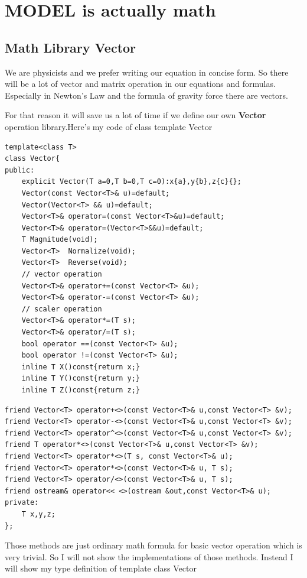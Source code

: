\documentclass[12pt]{article}
\begin{document}
\section{MODEL is actually math}
\subsection{Math Library Vector}
We are physicists and we prefer writing our equation in concise form.
So there will be a lot of vector and matrix operation in our equations and formulas.
Especially in Newton's Law and the formula of gravity force there are vectors.

For that reason it will save us a lot of time if we define our own \textbf{Vector} operation
library\cite{mathlibrary}.Here's my code of class template Vector
\begin{lstlisting}[caption=Vector Library I]
template<class T>
class Vector{
public:
    explicit Vector(T a=0,T b=0,T c=0):x{a},y{b},z{c}{};
    Vector(const Vector<T>& u)=default;
    Vector(Vector<T> && u)=default;
    Vector<T>& operator=(const Vector<T>&u)=default;
    Vector<T>& operator=(Vector<T>&&u)=default;
    T Magnitude(void);
    Vector<T>  Normalize(void);
    Vector<T>  Reverse(void);
    // vector operation
    Vector<T>& operator+=(const Vector<T> &u);
    Vector<T>& operator-=(const Vector<T> &u);
    // scaler operation
    Vector<T>& operator*=(T s);	
    Vector<T>& operator/=(T s);	
    bool operator ==(const Vector<T> &u);
    bool operator !=(const Vector<T> &u);
    inline T X()const{return x;}
    inline T Y()const{return y;}
    inline T Z()const{return z;}
\end{lstlisting}
\clearpage
\begin{lstlisting}[caption=Vector Library II]
friend Vector<T> operator+<>(const Vector<T>& u,const Vector<T> &v);
friend Vector<T> operator-<>(const Vector<T>& u,const Vector<T> &v);
friend Vector<T> operator^<>(const Vector<T>& u,const Vector<T> &v);
friend T operator*<>(const Vector<T>& u,const Vector<T> &v);
friend Vector<T> operator*<>(T s, const Vector<T>& u);
friend Vector<T> operator*<>(const Vector<T>& u, T s);
friend Vector<T> operator/<>(const Vector<T>& u, T s);
friend ostream& operator<< <>(ostream &out,const Vector<T>& u);
private:
    T x,y,z;
};
\end{lstlisting}

Those methods are just ordinary math formula for basic vector operation which is very trivial.
So I will not show the implementations of those methods.
Instead I will show my type definition of template class Vector
\end{document}
